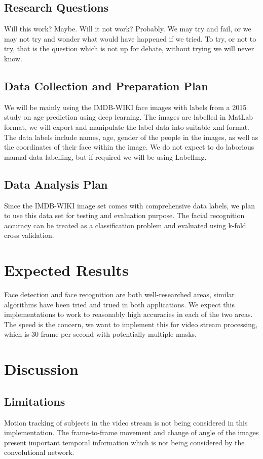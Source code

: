 \documentclass[conference]{IEEEtran}
\begin{document}
\subsection{Research Questions}
Will this work? Maybe. Will it not work? Probably. We may try and fail, or we may not try and wonder what would have happened if we tried. To try, or not to try, that is the question which is not up for debate, without trying we will never know.

\subsection{Data Collection and Preparation Plan}
We will be mainly using the IMDB-WIKI face images with labels from a 2015 study on age prediction using deep learning. The images are labelled in MatLab format, we will export and manipulate the label data into suitable xml format. The data labels include names, age, gender of the people in the images, as well as the coordinates of their face within the image. We do not expect to do laborious manual data labelling, but if required we will be using LabelImg.

\subsection{Data Analysis Plan}
Since the IMDB-WIKI image set comes with comprehensive data labels, we plan to use this data set for testing and evaluation purpose. The facial recognition accuracy can be treated as a classification problem and evaluated using k-fold cross validation.

\section{Expected Results}
Face detection and face recognition are both well-researched areas, similar algorithms have been tried and trued in both applications. We expect this implementations to work to reasonably high accuracies in each of the two areas. The speed is the concern, we want to implement this for video stream processing, which is 30 frame per second with potentially multiple masks.

\section{Discussion}


\subsection{Limitations}
Motion tracking of subjects in the video stream is not being considered in this implementation. The frame-to-frame movement and change of angle of the images present important temporal information which is not being considered by the convolutional network.
\end{document}
